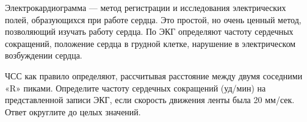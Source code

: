 
Электрокардиограмма
— метод регистрации и исследования электрических полей, образующихся при работе
сердца. Это простой, но очень ценный метод, позволяющий изучать работу сердца.
По ЭКГ определяют частоту сердечных сокращений, положение сердца в грудной
клетке, нарушение в электрическом возбуждении сердца.


ЧСС как правило определяют,
рассчитывая расстояние между двумя соседними «R» пиками. Определите частоту
сердечных сокращений (уд/мин) на представленной записи ЭКГ, если скорость
движения ленты была 20 мм/сек. Ответ округлите до целых значений.



